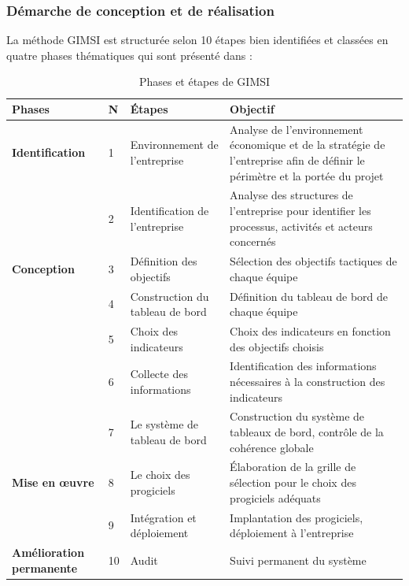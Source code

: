             \subsubsection[Démarche de conception et de réalisation]{Démarche de conception et de réalisation}
            La méthode GIMSI est structurée selon 10 étapes
            bien identifiées et classées en quatre phases thématiques qui sont présenté
            dans \cite*[Tab. \ref{table:phaseEtapeGimsi}]{fernandez2011nouveaux} :
            \begin{longtable}{p{3cm} p{0cm} p{4cm} p{5cm}}
                \caption{Phases et étapes de GIMSI}
                \label{table:phaseEtapeGimsi}
                \\\hline\hline
                    \textbf{Phases} & \textbf{N} & \textbf{Étapes} & \textbf{Objectif}
                \\\hline\hline
                    \textbf{Identification} & 1 & Environnement
                    de l’entreprise & Analyse de l’environnement économique
                    et de la stratégie de l’entreprise afin de
                    définir le périmètre et la portée du projet
                    \\
                        & 2 & Identification de l’entreprise & Analyse des structures
                    de l’entreprise pour identifier les processus, activités et acteurs concernés
                    \\
                    \textbf{Conception} & 3 & Définition des objectifs & 
                    Sélection des objectifs tactiques de chaque équipe
                    \\
                        & 4 & Construction du tableau de bord & Définition du tableau
                    de bord de chaque équipe
                    \\
                        & 5 & Choix des indicateurs & Choix des indicateurs en fonction
                    des objectifs choisis
                    \\
                        & 6 & Collecte des informations & Identification des informations nécessaires
                    à la construction des indicateurs
                    \\
                        & 7 & Le système de tableau de bord & Construction du
                    système de tableaux de bord, contrôle de la cohérence globale
                    \\
                    \textbf{Mise en œuvre} & 8 & Le choix des progiciels &
                    Élaboration de la grille de sélection pour le choix des progiciels adéquats
                    \\
                    & 9 & Intégration et déploiement & Implantation des progiciels,
                    déploiement à l’entreprise
                    \\
                    \textbf{Amélioration permanente} & 10 & Audit & Suivi
                    permanent du système
                \\\bottomrule
            \end{longtable}
